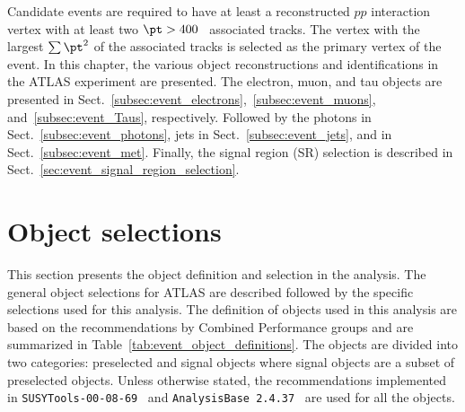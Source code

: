 Candidate events are required to have at least a reconstructed $pp$ interaction vertex with at least two $\pt > 400$~{\MeV} associated tracks.
The vertex with the largest $\sum \pt^{2}$ of the associated tracks is selected as the primary vertex of the event. 
In this chapter, the various object reconstructions and  identifications in the ATLAS experiment are presented.
The electron, muon, and tau objects are presented in Sect.~\ref{subsec:event_electrons},~\ref{subsec:event_muons}, and~\ref{subsec:event_Taus}, respectively.
Followed by the photons in Sect.~\ref{subsec:event_photons}, jets in Sect.~\ref{subsec:event_jets}, and \met in Sect.~\ref{subsec:event_met}.
Finally, the signal region (SR) selection is described in Sect.~\ref{sec:event_signal_region_selection}.


\section{Object selections}
\label{sec:event_object_selections}
This section presents the object definition and selection in the analysis.
The general object selections for ATLAS are described followed by the specific selections used for this analysis.
The definition of objects used in this analysis are based on the recommendations by Combined Performance groups and are summarized in Table~\ref{tab:event_object_definitions}.
The objects are divided into two categories: preselected and signal objects where signal objects are a subset of preselected objects.
Unless otherwise stated, the recommendations implemented in \texttt{SUSYTools-00-08-69}~\cite{SUSYToolsV8} and \texttt{AnalysisBase 2.4.37}~\cite{AnalysisBase} are used for all the objects.

